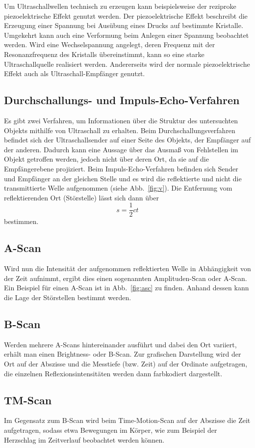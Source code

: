 Um Ultraschallwellen technisch zu erzeugen kann beispielsweise der reziproke piezoelektrische Effekt genutzt werden. Der piezoelektrische Effekt beschreibt die Erzeugung einer Spannung bei Ausübung eines Drucks auf bestimmte Kristalle. Umgekehrt kann auch eine Verformung beim Anlegen einer Spannung beobachtet werden. Wird eine Wechselspannung angelegt, deren Frequenz mit der Resonanzfrequenz des Kristalls übereinstimmt, kann so eine starke Ultraschallquelle realisiert werden. Andererseits wird der normale piezoelektrische Effekt auch als Ultraschall-Empfänger genutzt.

\subsection{Durchschallungs- und Impuls-Echo-Verfahren}
Es gibt zwei Verfahren, um Informationen über die Struktur des untersuchten Objekts mithilfe von Ultraschall zu erhalten. Beim Durchschallungsverfahren befindet sich der Ultraschallsender auf einer Seite des Objekts, der Empfänger auf der anderen. Dadurch kann eine Aussage über das Ausmaß von Fehlstellen im Objekt getroffen werden, jedoch nicht über deren Ort, da sie auf die Empfängerebene projiziert. Beim Impuls-Echo-Verfahren befinden sich Sender und Empfänger an der gleichen Stelle und es wird die reflektierte und nicht die transmittierte Welle aufgenommen (siehe Abb.~\ref{fig:v}). Die Entfernung vom reflektierenden Ort (Störstelle) lässt sich dann über
\begin{equation}
  \label{eqn}
  s = \frac{1}{2} c t
\end{equation}
bestimmen.
\subsection{A-Scan}
Wird nun die Intensität der aufgenommen reflektierten Welle in Abhängigkeit von der Zeit aufnimmt, ergibt dies einen sogenannten Amplituden-Scan oder A-Scan. Ein Beispiel für einen A-Scan ist in Abb.~\ref{fig:asc} zu finden. Anhand dessen kann die Lage der Störstellen bestimmt werden.
\subsection{B-Scan}
Werden mehrere A-Scans hintereinander ausführt und dabei den Ort variiert, erhält man einen Brightness- oder B-Scan. Zur grafischen Darstellung wird der Ort auf der Abszisse und die Messtiefe (bzw. Zeit) auf der Ordinate aufgetragen, die einzelnen Reflexionsintensitäten werden dann farbkodiert dargestellt.
\subsection{TM-Scan}
Im Gegensatz zum B-Scan wird beim Time-Motion-Scan auf der Abszisse die Zeit aufgetragen, sodass etwa Bewegungen im Körper, wie zum Beispiel der Herzschlag im Zeitverlauf beobachtet werden können.
